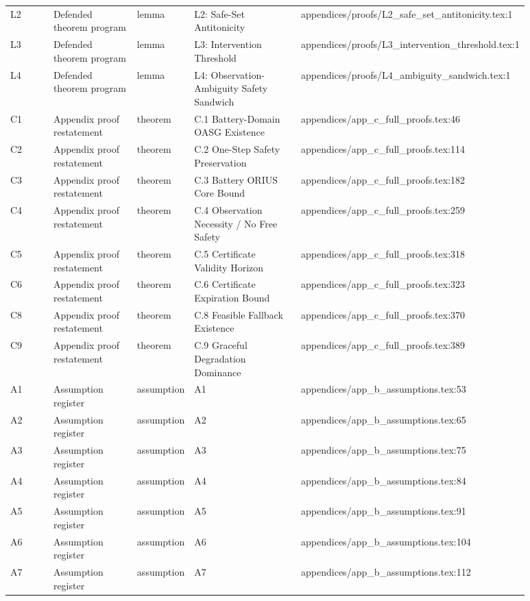 \begin{longtable}{p{0.10\linewidth}p{0.18\linewidth}p{0.10\linewidth}p{0.24\linewidth}p{0.26\linewidth}}
L2 & Defended theorem program & lemma & L2: Safe-Set Antitonicity & appendices/proofs/L2\_safe\_set\_antitonicity.tex:1 \\
L3 & Defended theorem program & lemma & L3: Intervention Threshold & appendices/proofs/L3\_intervention\_threshold.tex:1 \\
L4 & Defended theorem program & lemma & L4: Observation-Ambiguity Safety Sandwich & appendices/proofs/L4\_ambiguity\_sandwich.tex:1 \\
C1 & Appendix proof restatement & theorem & C.1 Battery-Domain OASG Existence & appendices/app\_c\_full\_proofs.tex:46 \\
C2 & Appendix proof restatement & theorem & C.2 One-Step Safety Preservation & appendices/app\_c\_full\_proofs.tex:114 \\
C3 & Appendix proof restatement & theorem & C.3 Battery ORIUS Core Bound & appendices/app\_c\_full\_proofs.tex:182 \\
C4 & Appendix proof restatement & theorem & C.4 Observation Necessity / No Free Safety & appendices/app\_c\_full\_proofs.tex:259 \\
C5 & Appendix proof restatement & theorem & C.5 Certificate Validity Horizon & appendices/app\_c\_full\_proofs.tex:318 \\
C6 & Appendix proof restatement & theorem & C.6 Certificate Expiration Bound & appendices/app\_c\_full\_proofs.tex:323 \\
C8 & Appendix proof restatement & theorem & C.8 Feasible Fallback Existence & appendices/app\_c\_full\_proofs.tex:370 \\
C9 & Appendix proof restatement & theorem & C.9 Graceful Degradation Dominance & appendices/app\_c\_full\_proofs.tex:389 \\
A1 & Assumption register & assumption & A1 & appendices/app\_b\_assumptions.tex:53 \\
A2 & Assumption register & assumption & A2 & appendices/app\_b\_assumptions.tex:65 \\
A3 & Assumption register & assumption & A3 & appendices/app\_b\_assumptions.tex:75 \\
A4 & Assumption register & assumption & A4 & appendices/app\_b\_assumptions.tex:84 \\
A5 & Assumption register & assumption & A5 & appendices/app\_b\_assumptions.tex:91 \\
A6 & Assumption register & assumption & A6 & appendices/app\_b\_assumptions.tex:104 \\
A7 & Assumption register & assumption & A7 & appendices/app\_b\_assumptions.tex:112 \\

\end{longtable}

